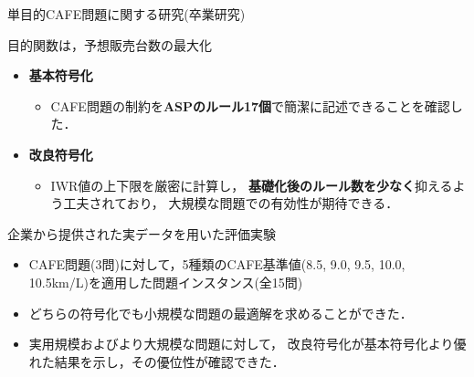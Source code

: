 \documentclass[dvipdfmx, 11pt]{beamer}
\begin{document}
\begin{frame}{単目的CAFE問題に関する研究(卒業研究)}
 \begin{block}{}\centering
  目的関数は，予想販売台数の最大化
 \end{block}
  \begin{itemize}
   \item {\bf 基本符号化}
	 \begin{itemize}
	  \item CAFE問題の制約を{\bf ASPのルール17個}で簡潔に記述できることを確認した．
	 \end{itemize}
   \item {\bf 改良符号化}
	 \begin{itemize}
	  \item IWR値の上下限を厳密に計算し，
		{\bf 基礎化後のルール数を少なく}抑えるよう工夫されており，
		大規模な問題での有効性が期待できる．
	 \end{itemize}
  \end{itemize}
 \begin{exampleblock}{企業から提供された実データを用いた評価実験}
  \begin{itemize}
   \item CAFE問題(3問)に対して，5種類のCAFE基準値(8.5, 9.0, 9.5,
	 10.0, 10.5km/L)を適用した問題インスタンス(全15問)  
   \item どちらの符号化でも小規模な問題の最適解を求めることができた．
   \item 実用規模およびより大規模な問題に対して，
	 改良符号化が基本符号化より優れた結果を示し，その優位性が確認できた．
  \end{itemize}
 \end{exampleblock}

\end{frame}
\end{document}
